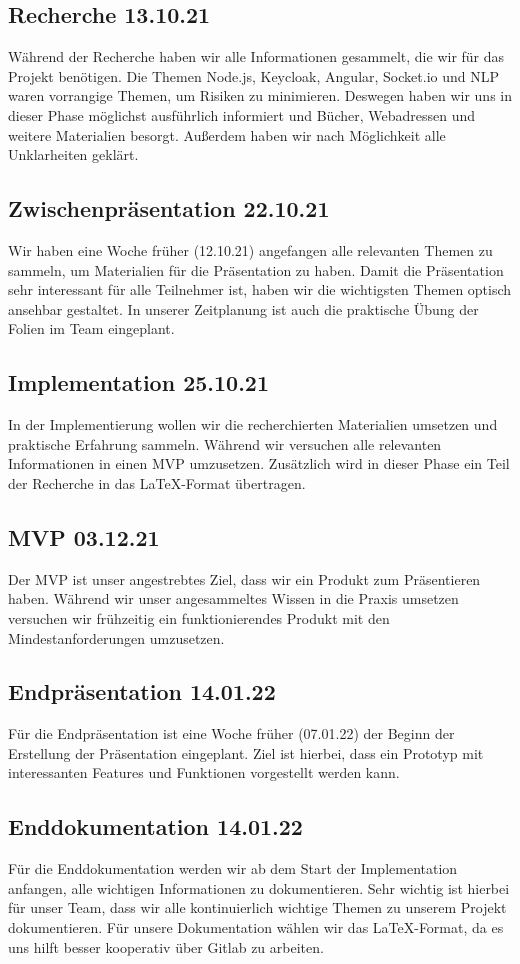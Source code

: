 \subsection{Recherche 13.10.21}
Während der Recherche haben wir alle Informationen gesammelt, die wir für das Projekt benötigen.
Die Themen Node.js, Keycloak, Angular, Socket.io und NLP waren vorrangige Themen, um Risiken zu minimieren.
Deswegen haben wir uns in dieser Phase möglichst ausführlich informiert und Bücher, Webadressen
und weitere Materialien besorgt. Außerdem haben wir nach Möglichkeit alle Unklarheiten geklärt.

\subsection{Zwischenpräsentation 22.10.21}
Wir haben eine Woche früher (12.10.21) angefangen alle relevanten Themen zu sammeln, um Materialien für die Präsentation zu haben.
Damit die Präsentation sehr interessant für alle Teilnehmer ist, haben wir die wichtigsten Themen optisch ansehbar gestaltet.
In unserer Zeitplanung ist auch die praktische Übung der Folien im Team eingeplant.

\subsection{Implementation 25.10.21}
In der Implementierung wollen wir die recherchierten Materialien umsetzen und praktische Erfahrung sammeln.
Während wir versuchen alle relevanten Informationen in einen MVP umzusetzen. Zusätzlich wird in dieser Phase
ein Teil der Recherche in das \LaTeX-Format übertragen.

\subsection{MVP 03.12.21}
Der MVP ist unser angestrebtes Ziel, dass wir ein Produkt zum Präsentieren haben.
Während wir unser angesammeltes Wissen in die Praxis umsetzen versuchen wir
frühzeitig ein funktionierendes Produkt mit den Mindestanforderungen umzusetzen.

\subsection{Endpräsentation 14.01.22}
Für die Endpräsentation ist eine Woche früher (07.01.22) der Beginn der Erstellung der Präsentation eingeplant.
Ziel ist hierbei, dass ein Prototyp mit interessanten Features und Funktionen vorgestellt werden kann.

\subsection{Enddokumentation 14.01.22}
Für die Enddokumentation werden wir ab dem Start der Implementation anfangen, alle wichtigen Informationen zu dokumentieren.
Sehr wichtig ist hierbei für unser Team, dass wir alle kontinuierlich wichtige Themen zu unserem Projekt dokumentieren.
Für unsere Dokumentation wählen wir das \LaTeX-Format, da es uns hilft besser kooperativ über Gitlab zu arbeiten.
